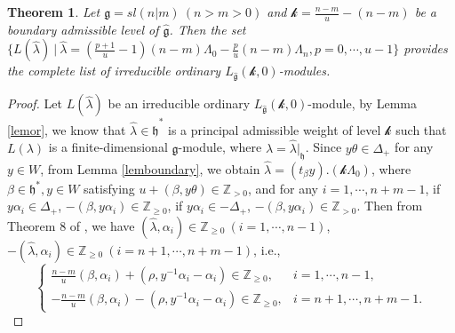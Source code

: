 \documentclass[12pt]{article}
\newtheorem{thm}{Theorem}[section]
\begin{document}
\begin{thm}
Let $\mathfrak{g}=sl(n|m)~(n>m>0)$ and
$\mathcal{k}=\frac{n-m}{u}-(n-m)$ be a boundary admissible level of $\widehat{\mathfrak{g}}$.
Then the set $\{L(\hat{\lambda})~|~\hat{\lambda}=(\frac{p+1}{u}-1)(n-m)\Lambda_0-\frac{p}{u}(n-m)\Lambda_n, p=0,\cdots,u-1\}$
provides the complete list of irreducible ordinary $L_{\widehat{\mathfrak{g}}}(\mathcal{k},0)$-modules.
\end{thm}
\begin{proof}
Let $L(\hat{\lambda})$ be an irreducible ordinary $L_{\widehat{\mathfrak{g}}}(\mathcal{k},0)$-module,
by Lemma \ref{lemor}, we know that $\hat{\lambda}\in \widehat{\mathfrak{h}}^*$ is a principal admissible weight of level $\mathcal{k}$ such that $L(\lambda)$
is a finite-dimensional $\mathfrak{g}$-module, where $\lambda=\hat{\lambda}|_{\mathfrak{h}}$.
Since $y\theta\in \Delta_+$ for any $y\in W$, from Lemma \ref{lemboundary}, we obtain $\hat{\lambda}=(t_\beta y).(\mathcal{k}\Lambda_0)$,
where $\beta\in \mathfrak{h}^*, y\in W$ satisfying
$u+(\beta,y\theta)\in\mathbb{Z}_{>0}$,
and for any $i=1,\cdots,n+m-1$,
if $y\alpha_i\in \Delta_+$, $-(\beta,y\alpha_i)\in\mathbb{Z}_{\geq0}$,
if $y\alpha_i\in -\Delta_+$, $-(\beta,y\alpha_i)\in\mathbb{Z}_{>0}$.
Then from Theorem 8 of \cite{Kac77},
we have $(\hat{\lambda}, \alpha_i)\in \mathbb{Z}_{\geq0} ~(i=1,\cdots,n-1)$, $-(\hat{\lambda}, \alpha_i)\in \mathbb{Z}_{\geq0} ~(i=n+1,\cdots,n+m-1)$,
i.e.,
$$\begin{cases}
 \frac{n-m}{u}(\beta,\alpha_i)+(\rho,y^{-1}\alpha_i-\alpha_i)\in \mathbb{Z}_{\geq0}, & i=1,\cdots,n-1,\\
 -\frac{n-m}{u}(\beta,\alpha_i)-(\rho,y^{-1}\alpha_i-\alpha_i)\in \mathbb{Z}_{\geq0},  &i=n+1,\cdots,n+m-1.
\end{cases}$$


\end{proof}
\end{document}
